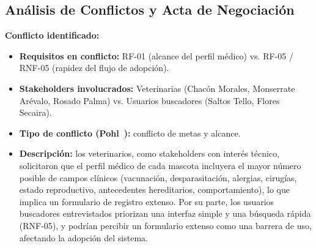 \documentclass[journal,onecolumn]{IEEEtran}
\begin{document}
\subsection{Análisis de Conflictos y Acta de Negociación}
\label{sec:conflictos}

\textbf{Conflicto identificado:}
\begin{itemize}[leftmargin=*]
  \item \textbf{Requisitos en conflicto:} RF-01 (alcance del perfil médico)
  vs. RF-05 / RNF-05 (rapidez del flujo de adopción).
  \item \textbf{Stakeholders involucrados:} Veterinarias (Chacón Morales,
  Monserrate Arévalo, Rosado Palma) vs. Usuarios buscadores (Saltos Tello,
  Flores Secaira).
  \item \textbf{Tipo de conflicto (Pohl~\cite{pohl2025}):} conflicto de
  metas y alcance.
  \item \textbf{Descripción:} los veterinarios, como stakeholders con
  interés técnico, solicitaron que el perfil médico de cada mascota
  incluyera el mayor número posible de campos clínicos (vacunación,
  desparasitación, alergias, cirugías, estado reproductivo, antecedentes
  hereditarios, comportamiento), lo que implica un formulario de registro
  extenso. Por su parte, los usuarios buscadores entrevistados priorizan
  una interfaz simple y una búsqueda rápida (RNF-05), y podrían percibir un
  formulario extenso como una barrera de uso, afectando la adopción del
  sistema.
\end{itemize}
\end{document}
